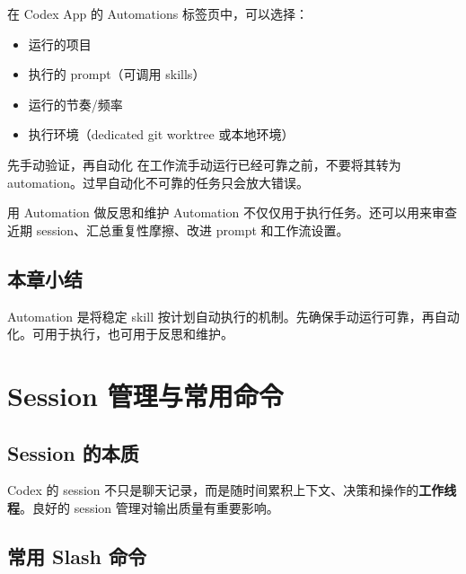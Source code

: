 \documentclass[a4paper]{article}
\begin{document}
在 Codex App 的 Automations 标签页中，可以选择：
\begin{itemize}
    \item 运行的项目
    \item 执行的 prompt（可调用 skills）
    \item 运行的节奏/频率
    \item 执行环境（dedicated git worktree 或本地环境）
\end{itemize}

\begin{warningbox}{先手动验证，再自动化}
在工作流手动运行已经可靠之前，不要将其转为 automation。过早自动化不可靠的任务只会放大错误。
\end{warningbox}

\begin{knowledgebox}{用 Automation 做反思和维护}
Automation 不仅仅用于执行任务。还可以用来审查近期 session、汇总重复性摩擦、改进 prompt 和工作流设置。
\end{knowledgebox}

\subsection{本章小结}

Automation 是将稳定 skill 按计划自动执行的机制。先确保手动运行可靠，再自动化。可用于执行，也可用于反思和维护。

\section{Session 管理与常用命令}

\subsection{Session 的本质}

Codex 的 session 不只是聊天记录，而是随时间累积上下文、决策和操作的\textbf{工作线程}。良好的 session 管理对输出质量有重要影响。

\subsection{常用 Slash 命令}
\end{document}
